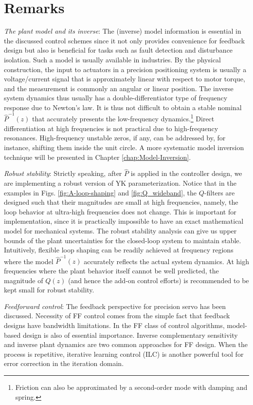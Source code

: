 \documentclass [11pt, proquest] {uwthesis}[2020/02/24]
\begin{document}
\section{Remarks}

\label{sec:comments}\emph{The plant model and its inverse}: The
(inverse) model information is essential in the discussed control
schemes since it not only provides convenience for feedback design
but also is beneficial for tasks such as fault detection and disturbance
isolation. Such a model is usually available in industries. By the
physical construction, the input to actuators in a precision positioning
system is usually a voltage/current signal that is approximately linear
with respect to motor torque, and the measurement is commonly an angular
or linear position. The inverse system dynamics thus usually has a
double-differentiator type of frequency response due to Newton's law.
It is thus not difficult to obtain a stable nominal $\hat{P}^{-1}(z)$
that accurately presents the low-frequency dynamics.\footnote{Friction can also be approximated by a second-order mode with damping
and spring.} Direct differentiation at high frequencies is not practical due to
high-frequency resonances. High-frequency unstable zeros, if any,
can be addressed by, for instance, shifting them inside the unit circle. A more systematic model inversion technique will be presented in Chapter \ref{chap:Model-Inversion}.

\emph{Robust stability}:\emph{ }Strictly speaking, after $\hat{P}$
is applied in the controller design, we are implementing a robust
version of YK parameterization. Notice that in the examples in Figs.
\ref{fig:A-loop-shaping} and \ref{fig:Q_wideband}, the $Q$-filters
are designed such that their magnitudes are small at high frequencies,
namely, the loop behavior at ultra-high frequencies does not change.
This is important for implementation, since it is practically impossible
to have an exact mathematical model for mechanical systems. The robust
stability analysis can give us upper bounds of the plant uncertainties
for the closed-loop system to maintain stable. Intuitively, flexible
loop shaping can be readily achieved at frequency regions where the
model $\hat{P}^{-1}(z)$ accurately reflects the actual system dynamics.
At high frequencies where the plant behavior itself cannot be well
predicted, the magnitude of $Q(z)$ (and hence the add-on control
efforts) is recommended to be kept small for robust stability. 

\emph{Feedforward control}: The feedback perspective for precision
servo has been discussed. Necessity
of FF control comes from the simple fact that feedback designs have
bandwidth limitations. In the FF class of control algorithms, model-based
design is also of essential importance. Inverse complementary sensitivity
and inverse plant dynamics are two common approaches for FF design.
When the process is repetitive, iterative learning control (ILC) is
another powerful tool for error correction in the iteration domain.\emph{}
\end{document}
